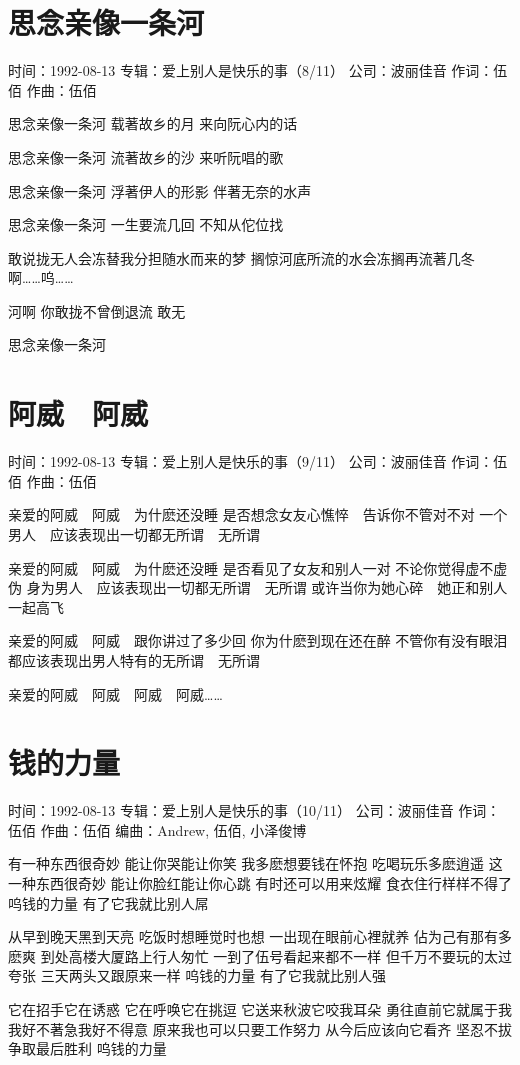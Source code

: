 \documentclass[UTF8,a4paper,oneside,twocolumn,12pt]{ctexbook}
\newcommand{\infopair}[2]{\textbullet #1：#2}
\newcommand{\zc}[1][伍佰]{\infopair{作词}{#1}}
\newcommand{\zq}[1][伍佰]{\infopair{作曲}{#1}}
\newcommand{\bq}[1][伍佰]{\infopair{编曲}{#1}}
\newcommand{\zj}[1]{\infopair{专辑}{#1}}
\newcommand{\sj}[1]{\infopair{时间}{#1}}
\newcommand{\gs}[1]{\infopair{公司}{#1}}
\newenvironment{info}{\begin{flushleft}\kaishu
	}
	{\end{flushleft}\normalsize\yahei\par}
\newenvironment{lyric}{
	}
{}
\begin{document}
\section{思念亲像一条河}
\begin{info}
	\sj{1992-08-13}
	\zj{爱上别人是快乐的事（8/11）}
	\gs{波丽佳音}
	\zc
	\zq
\end{info}
\begin{lyric}
	思念亲像一条河
	载著故乡的月
	来向阮心内的话

	思念亲像一条河
	流著故乡的沙
	来听阮唱的歌

	思念亲像一条河
	浮著伊人的形影
	伴著无奈的水声

	思念亲像一条河
	一生要流几回
	不知从佗位找

	敢说拢无人会冻替我分担随水而来的梦
	搁惊河底所流的水会冻搁再流著几冬
	啊……呜……

	河啊
	你敢拢不曾倒退流
	敢无

	思念亲像一条河
\end{lyric}

\section{阿威　阿威}
\begin{info}
	\sj{1992-08-13}
	\zj{爱上别人是快乐的事（9/11）}
	\gs{波丽佳音}
	\zc
	\zq
\end{info}
\begin{lyric}
	亲爱的阿威　阿威　为什麽还没睡
	是否想念女友心憔悴　告诉你不管对不对
	一个男人　应该表现出一切都无所谓　无所谓

	亲爱的阿威　阿威　为什麽还没睡
	是否看见了女友和别人一对
	不论你觉得虚不虚伪
	身为男人　应该表现出一切都无所谓　无所谓
	或许当你为她心碎　她正和别人一起高飞

	亲爱的阿威　阿威　跟你讲过了多少回
	你为什麽到现在还在醉
	不管你有没有眼泪
	都应该表现出男人特有的无所谓　无所谓

	亲爱的阿威　阿威　阿威　阿威……
\end{lyric}

\section{钱的力量}
\begin{info}
	\sj{1992-08-13}
	\zj{爱上别人是快乐的事（10/11）}
	\gs{波丽佳音}
	\zc
	\zq
	\bq[Andrew, 伍佰, 小泽俊博]
\end{info}
\begin{lyric}
	有一种东西很奇妙
	能让你哭能让你笑
	我多麽想要钱在怀抱
	吃喝玩乐多麽逍遥
	这一种东西很奇妙
	能让你脸红能让你心跳
	有时还可以用来炫耀
	食衣住行样样不得了
	呜钱的力量
	有了它我就比别人屌

	从早到晚天黑到天亮
	吃饭时想睡觉时也想
	一出现在眼前心裡就养
	佔为己有那有多麽爽
	到处高楼大厦路上行人匆忙
	一到了伍号看起来都不一样
	但千万不要玩的太过夸张
	三天两头又跟原来一样
	呜钱的力量
	有了它我就比别人强

	它在招手它在诱惑
	它在呼唤它在挑逗
	它送来秋波它咬我耳朵
	勇往直前它就属于我
	我好不著急我好不得意
	原来我也可以只要工作努力
	从今后应该向它看齐
	坚忍不拔争取最后胜利
	呜钱的力量
\end{lyric}
\end{document}
